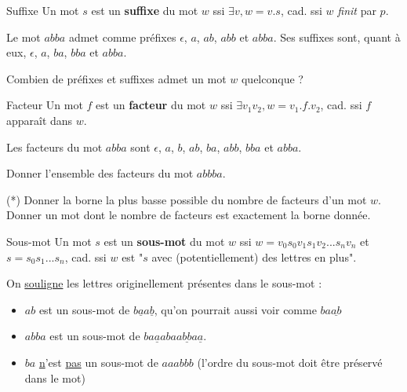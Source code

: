 \begin{definition}{Suffixe}{}
Un mot $s$ est un \textbf{suffixe} du mot $w$ ssi $\exists v, w = v.s$, cad. ssi $w$ \textit{finit} par $p$.
\end{definition}

\begin{example}
Le mot $abba$ admet comme préfixes $\epsilon$, $a$, $ab$, $abb$ et $abba$. Ses suffixes sont, quant à eux, $\epsilon$, $a$, $ba$, $bba$ et $abba$.
\end{example}

\begin{exercice}\label{expref}
Combien de préfixes et suffixes admet un mot $w$ quelconque ?
\end{exercice}

\begin{definition}{Facteur}{}
Un mot $f$ est un \textbf{facteur} du mot $w$ ssi $\exists v_1 v_2, w = v_1.f.v_2$, cad. ssi $f$ apparaît dans $w$.
\end{definition}

\begin{example}
Les facteurs du mot $abba$ sont $\epsilon$, $a$, $b$, $ab$, $ba$, $abb$, $bba$ et $abba$. 
\end{example}


\begin{exercice}
Donner l'ensemble des facteurs du mot $abbba$.
\end{exercice}

\begin{exercice} \label{exfact}(*)
Donner la borne la plus basse possible du nombre de facteurs d'un mot $w$. Donner un mot dont le nombre de facteurs est exactement la borne donnée.
\end{exercice}

\begin{definition}{Sous-mot}{}
Un mot $s$ est un \textbf{sous-mot} du mot $w$ ssi $w = v_0s_0v_1s_1v_2...s_nv_n$ et $s = s_0s_1...s_n$, cad. ssi $w$ est "$s$ avec (potentiellement) des lettres en plus".
\end{definition}

\begin{example}\label{ex5} On \underline{souligne} les lettres originellement présentes dans le sous-mot :
\begin{itemize}
   \item $ab$ est un sous-mot de $b\underline{a}a\underline{b}$, qu'on pourrait aussi voir comme $ba\underline{ab}$
   \item $abba$ est un sous-mot de $ba\underline{a}abaa\underline{bb}a\underline{a}$.
   \item $ba$ \underline{n}'est \underline{pas} un sous-mot de $aaabbb$ (l'ordre du sous-mot doit être préservé dans le mot) 
\end{itemize}
\end{example}


